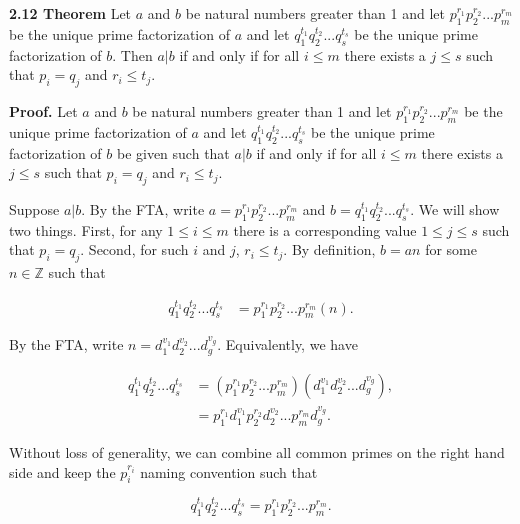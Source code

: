 \documentclass[12pt]{article}
\begin{document}
\noindent\textbf{2.12 Theorem} Let $a$ and $b$ be natural numbers greater than 1 and let $p_{1}^{r_{1}}p_{2}^{r_{2}}...p_{m}^{r_{m}}$ be the unique prime factorization of $a$ and let $q_{1}^{t_{1}}q_{2}^{t_{2}}...q_{s}^{t_{s}}$ be the unique prime factorization of $b$. Then $a|b$ if and only if for all $i\leq m$ there exists a $j\leq s$ such that $p_{i}=q_{j}$ and $r_{i}\leq t_{j}$.

\bigskip

\noindent\textbf{Proof.} Let $a$ and $b$ be natural numbers greater than 1 and let $p_{1}^{r_{1}}p_{2}^{r_{2}}...p_{m}^{r_{m}}$ be the unique prime factorization of $a$ and let $q_{1}^{t_{1}}q_{2}^{t_{2}}...q_{s}^{t_{s}}$ be the unique prime factorization of $b$ be given such that $a|b$ if and only if for all $i\leq m$ there exists a $j\leq s$ such that $p_{i}=q_{j}$ and $r_{i}\leq t_{j}$.

\bigskip

\noindent Suppose $a|b$. By the FTA, write $a=p_{1}^{r_{1}}p_{2}^{r_{2}}...p_{m}^{r_{m}}$ and $b=q_{1}^{t_{1}}q_{2}^{t_{2}}...q_{s}^{t_{s}}$. We will show two things. First, for any $1\leq i\leq m$ there is a corresponding value $1\leq j \leq s$ such that $p_i=q_j$. Second, for such $i$ and $j$, $r_{i}\leq t_{j}$. By definition, $b=an$ for some $n\in\mathbb{Z}$ such that

\begin{align*}
q_{1}^{t_{1}}q_{2}^{t_{2}}...q_{s}^{t_{s}} &= p_{1}^{r_{1}}p_{2}^{r_{2}}...p_{m}^{r_{m}}(n).
\end{align*}

\noindent By the FTA, write $n=d_{1}^{v_{1}}d_{2}^{v_{2}}...d_{g}^{v_{g}}$. Equivalently, we have

\begin{align*}
q_{1}^{t_{1}}q_{2}^{t_{2}}...q_{s}^{t_{s}} &= (p_{1}^{r_{1}}p_{2}^{r_{2}}...p_{m}^{r_{m}})(d_{1}^{v_{1}}d_{2}^{v_{2}}...d_{g}^{v_{g}}), \\
&= p_{1}^{r_{1}}d_{1}^{v_{1}}p_{2}^{r_{2}}d_{2}^{v_{2}}...p_{m}^{r_{m}}d_{g}^{v_{g}}.
\end{align*}

\noindent Without loss of generality, we can combine all common primes on the right hand side and keep the $p_{i}^{r_{i}}$ naming convention such that 

\begin{equation*}
q_{1}^{t_{1}}q_{2}^{t_{2}}...q_{s}^{t_{s}} = p_{1}^{r_{1}}p_{2}^{r_{2}}...p_{m}^{r_{m}}.
\end{equation*}
\end{document}
